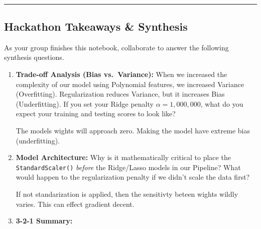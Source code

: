 \documentclass[11pt]{article}
\begin{document}
    \begin{center}
    \end{center}
    { \hspace*{\fill} \\}
    
    \begin{center}\rule{0.5\linewidth}{0.5pt}\end{center}

    \subsection{Hackathon Takeaways \&
Synthesis}\label{hackathon-takeaways-synthesis}

As your group finishes this notebook, collaborate to answer the
following synthesis questions.

\begin{enumerate}
\def\labelenumi{\arabic{enumi}.}
\item
  \textbf{Trade-off Analysis (Bias vs.~Variance):} When we increased the
  complexity of our model using Polynomial features, we increased
  Variance (Overfitting). Regularization reduces Variance, but it
  increases Bias (Underfitting). If you set your Ridge penalty
  \(\alpha = 1,000,000\), what do you expect your training and testing
  scores to look like?

  The models wights will approach zero. Making the model have extreme
  bias (underfitting).
\item
  \textbf{Model Architecture:} Why is it mathematically critical to
  place the \texttt{StandardScaler()} \emph{before} the Ridge/Lasso
  models in our Pipeline? What would happen to the regularization
  penalty if we didn't scale the data first?

  If not standarization is applied, then the sensitivty beteen wights
  wildly varies. This can effect gradient decent.
\item
  \textbf{3-2-1 Summary:}
\end{enumerate}
\end{document}

